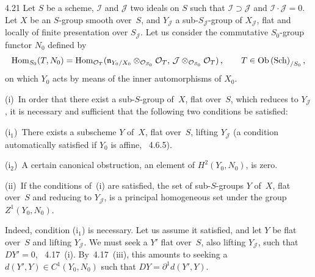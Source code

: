 \begin{theorem}{4.21}\label{III.4.21}
Let \(S\) be a scheme, \(\mathcal{I}\) and \(\mathcal{J}\) two ideals%
{\renewcommand{\thefootnote}{(115)}}
on \(S\) such that \(\mathcal{I}\supset\mathcal{J}\) and
\(\mathcal{I}\cdot\mathcal{J}=0\). Let \(X\) be an \(S\)-group smooth over~\(S\),
and \(Y_{\mathcal{J}}\) a sub-\(S_{\mathcal{J}}\)-group of \(X_{\mathcal{J}}\),
flat and locally of finite presentation over \(S_{\mathcal{J}}\). Let us
consider the commutative \(S_{0}\)-group functor \(N_{0}\) defined by
\[
\operatorname{Hom}_{S_{0}}(T,N_{0})
=
\operatorname{Hom}_{\mathcal{O}_{T}}(\mathfrak{n}_{Y_{0}/X_{0}}\otimes_{\mathcal{O}_{S_{0}}}\mathcal{O}_{T},\,
\mathcal{J}\otimes_{\mathcal{O}_{S_{0}}}\mathcal{O}_{T})\,,
\qquad
T\in\operatorname{Ob}\textup{(Sch)}_{/S_{0}}\,,
\]
on which \(Y_{0}\) acts by means of the inner automorphisms of \(X_{0}\).

(i)~In order that there exist a sub-\(S\)-group of~\(X\), flat over~\(S\),
which reduces to \(Y_{\mathcal{J}}\), it is necessary and sufficient that the
following two conditions be satisfied:

(i\(_1\))~There exists a subscheme \(Y\) of~\(X\), flat over~\(S\), lifting
\(Y_{\mathcal{J}}\) (a condition automatically satisfied if \(Y_{0}\) is
affine, \cf~4.6.5).

(i\(_2\))~A certain canonical obstruction, an element of
\(H^{2}(Y_{0},N_{0})\), is zero.

(ii)~If the conditions of~(i) are satisfied, the set of sub-\(S\)-groups \(Y\)
of~\(X\), flat over~\(S\) and reducing to \(Y_{\mathcal{J}}\), is a principal
homogeneous set under the group \(Z^{1}(Y_{0},N_{0})\).%
{\renewcommand{\thefootnote}{(116)}}
\end{theorem}

Indeed, condition (i\(_1\)) is necessary. Let us assume it satisfied, and let
\(Y\) be flat over~\(S\) and lifting \(Y_{\mathcal{J}}\). We must seek a \(Y'\)
flat over~\(S\), also lifting \(Y_{\mathcal{J}}\), such that \(DY'=0\),%
{\renewcommand{\thefootnote}{(117)}}
\cf~4.17~(i). By~4.17~(iii), this amounts to seeking a
\(d(Y',Y)\in C^{1}(Y_{0},N_{0})\) such that
\(DY=\partial^{1}d(Y',Y)\).%
{\renewcommand{\thefootnote}{(118)}}

